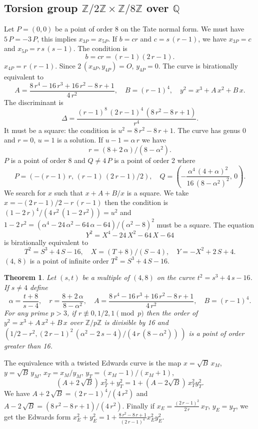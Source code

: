 \documentclass[a4paper, 11pt, pdftex]{report}
\theoremstyle{plain}
\newtheorem{theorem}{Theorem}[chapter]
\theoremstyle{definition}
\begin{document}
\subsection{Torsion group $\mathbb{Z}/2\mathbb{Z} \times \mathbb{Z}/8\mathbb{Z}$ over $\mathbb{Q}$}

Let $P = (0, 0)$ be a point of order 8 on the Tate normal form. We must have $5\,P = -3\,P$,
this implies $x_{3P} = x_{5P}$. If $b = cr$ and $c = s\,(r - 1)$,
we have $x_{3P} = c$ and $x_{5P} = r\,s\,(s - 1)$. The condition is
$$b = cr = (r - 1)(2\,r - 1).$$
$x_{4P} = r\,(r - 1)$. Since $2\,(x_{4P}, y_{4P}) = O$, $y_{4P} = 0$. The curve is 
birationally equivalent to
$$A = \frac{8\,r^4 - 16\,r^3 + 16\,r^2 - 8\,r + 1}{4\,r^2},\quad
B = (r - 1)^4,\quad y^2 = x^3 + A\,x^2 + B\,x.$$
The discriminant is
$$\Delta = \frac{(r - 1)^8\, (2\,r - 1)^4\, (8\,r^2 - 8\,r + 1)}{r^4}.$$
It must be a square: the condition is $u^2 = 8\,r^2 - 8\,r + 1$.
The curve has genus 0 and $r = 0$, $u = 1$ is a solution. If $u - 1 = \alpha\,r$ we have
$$r = (8 + 2\,\alpha) / (8 - \alpha^2).$$
$P$ is a point of order 8 and $Q \neq 4\,P$ is a point of order 2 where
$$P = \left(-(r - 1)\,r,\, (r - 1)\,(2\,r - 1) / 2\right),\quad
  Q = \left(-\frac{\alpha^4\,(4 + \alpha)^2}{16\,(8 - \alpha^2)^2},\, 0\right).$$
We search for $x$ such that $x + A + B / x$ is a square. We take
$x = -(2\,r - 1)/2 - r\,(r - 1)$ then
the condition is $(1 - 2\,r)^4 / (4\,r^2\,(1 - 2\,r^2)) = u^2$ and
$1 - 2\,r^2 = (\alpha^4 - 24\,\alpha^2 - 64\,\alpha - 64) / (\alpha^2 - 8)^2$
must be a square. The equation
$$Y^2 = X^4 - 24\,X^2 - 64\,X - 64$$
is birationally equivalent to
$$T^2 = S^3 + 4\,S - 16,\quad X = (T + 8) / (S - 4),\quad Y = -X^2 + 2\,S + 4.$$
$(4,\, 8)$ is a point of infinite order $T^2 = S^3 + 4\,S - 16$.

\begin{theorem}
Let $(s, t)$ be a multiple of $(4, 8)$ on the curve $t^2 = s^3 + 4\,s - 16$. If
$s \neq 4$  define
$$\alpha = \frac{t + 8}{s - 4},\quad r = \frac{8 + 2\,\alpha}{8 - \alpha^2},\quad
A = \frac{8\,r^4 - 16\,r^3 + 16\,r^2 - 8\,r + 1}{4\,r^2},\quad
B = (r - 1)^4.$$
For any prime $p > 3$, if $r \not\equiv 0, 1/2, 1 \pmod p$ then the order of
$y^2 = x^3 + A\, x^2 + B\, x$ over $\mathbb{Z}/p\mathbb{Z}$ is divisible by 16 and
$(1/2 - r^2, (2\,r - 1)^2\, (\alpha^2 - 2\,s - 4) / (4\,r\,(8 - \alpha^2))\,)$ is
a point of order greater than 16.
\end{theorem}

The equivalence with a twisted Edwards curve is the map $x = \sqrt{B}\,x_M$, $y = \sqrt{B}\,y_M$,
$x_T = x_M / y_M$, $y_T = (x_M - 1)/(x_M + 1)$,
$$(A + 2\,\sqrt{B})\,x_T^2 + y_T^2 = 1 + (A - 2\sqrt{B})\,x_T^2y_T^2.$$
We have $A + 2\,\sqrt{B} = (2\,r - 1)^4 / (4\,r^2)$ and
$A - 2\,\sqrt{B} = (8\,r^2 - 8\,r + 1) / (4\,r^2)$.
Finally if $x_E = \frac{(2\,r - 1)^2}{2\,r}\,x_T$, $y_E = y_T$, we get the Edwards form
$x_E^2 + y_E^2 = 1 + \frac{8\,r^2 - 8\,r + 1}{(2\,r - 1)^4} x_E^2y_E^2$.
\end{document}
